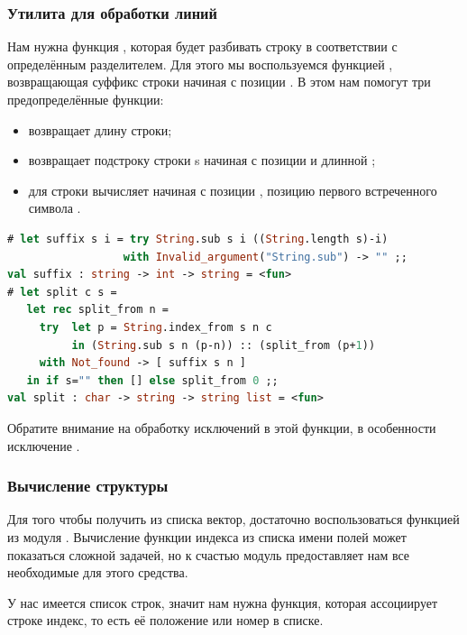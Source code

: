 \subsubsection{Утилита для обработки линий}

Нам нужна функция , которая будет разбивать строку в соответствии с 
определённым разделителем. Для этого мы воспользуемся функцией , 
возвращающая суффикс строки  начиная с позиции . В этом нам 
помогут три предопределённые функции:

\begin{itemize}
	\item {} возвращает длину строки;

	\item {} возвращает подстроку строки s начиная с позиции 
 и длинной ;

	\item {} для строки  вычисляет начиная с 
позиции , позицию первого встреченного символа .
\end{itemize}

\begin{lstlisting}[language=OCaml]
# let suffix s i = try String.sub s i ((String.length s)-i) 
                  with Invalid_argument("String.sub") -> "" ;;
val suffix : string -> int -> string = <fun>
# let split c s = 
   let rec split_from n = 
     try  let p = String.index_from s n c 
          in (String.sub s n (p-n)) :: (split_from (p+1)) 
     with Not_found -> [ suffix s n ] 
   in if s="" then [] else split_from 0 ;;
val split : char -> string -> string list = <fun>
\end{lstlisting}

Обратите внимание на обработку исключений в этой функции, в особенности 
исключение .

\subsubsection{Вычисление структуры }

Для того чтобы получить из списка вектор, достаточно воспользоваться функцией 
 из модуля . Вычисление функции индекса из списка 
имени полей может показаться сложной задачей, но к счастью модуль  
предоставляет нам все необходимые для этого средства.

У нас имеется список строк, значит нам нужна функция, которая ассоциирует строке 
индекс, то есть её положение или номер в списке.


